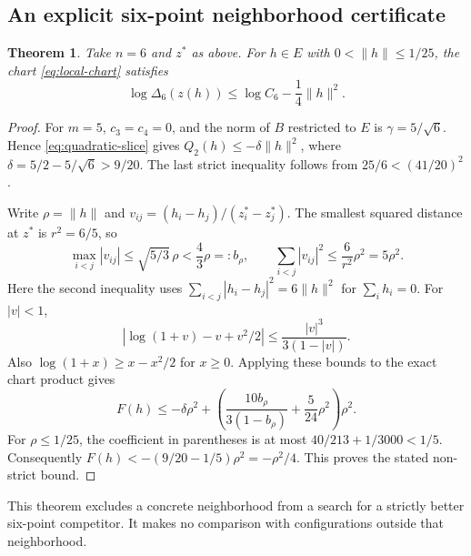 \documentclass[11pt]{article}
\newtheorem{theorem}{Theorem}[section]
\theoremstyle{remark}
\numberwithin{equation}{section}
\begin{document}
\subsection{An explicit six-point neighborhood certificate}
\begin{theorem}\label{thm:six-basin}
Take $n=6$ and $z^*$ as above. For $h\in E$ with
$0<\|h\|\le1/25$, the chart \eqref{eq:local-chart} satisfies
\begin{equation}\label{eq:six-basin}
 \log\Delta_6(z(h))\le\log C_6-\frac14\|h\|^2.
\end{equation}
\end{theorem}
\begin{proof}
For $m=5$, $c_3=c_4=0$, and the norm of $B$ restricted to $E$
is $\gamma=5/\sqrt6$. Hence \eqref{eq:quadratic-slice} gives
$Q_2(h)\le-\delta\|h\|^2$, where
$\delta=5/2-5/\sqrt6>9/20$.
The last strict inequality follows from $25/6<(41/20)^2$.

Write $\rho=\|h\|$ and
$v_{ij}=(h_i-h_j)/(z_i^*-z_j^*)$.
The smallest squared distance at $z^*$ is $r^2=6/5$, so
\[
 \max_{i<j}|v_{ij}|\le\sqrt{5/3}\,\rho<\frac43\rho=:b_\rho,
 \qquad
 \sum_{i<j}|v_{ij}|^2\le\frac6{r^2}\rho^2=5\rho^2.
\]
Here the second inequality uses
$\sum_{i<j}|h_i-h_j|^2=6\|h\|^2$ for $\sum_i h_i=0$.
For $|v|<1$,
\[
 |\log(1+v)-v+v^2/2|
 \le\frac{|v|^3}{3(1-|v|)}.
\]
Also $\log(1+x)\ge x-x^2/2$ for $x\ge0$.
Applying these bounds to the exact chart product gives
\[
 F(h)\le-\delta\rho^2+
 \left(\frac{10b_\rho}{3(1-b_\rho)}+\frac5{24}\rho^2\right)\rho^2.
\]
For $\rho\le1/25$, the coefficient in parentheses is at most
$40/213+1/3000<1/5$. Consequently
$F(h)<-(9/20-1/5)\rho^2=-\rho^2/4$.
This proves the stated non-strict bound.
\end{proof}

This theorem excludes a concrete neighborhood from a search for a
strictly better six-point competitor. It makes no comparison with
configurations outside that neighborhood.
\end{document}
